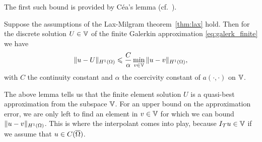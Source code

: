 \documentclass[thesis.tex]{subfiles}
\begin{document}
  The first such bound is provided by C\'ea's lemma (cf.~\cite[Thm~2.8.1]{brenner}).
  \begin{lem}
    Suppose the assumptions of the Lax-Milgram theorem~\ref{thm:lax} hold. Then for the discrete solution $U \in \mathbb{V}$ of the
    finite Galerkin approximation \eqref{eq:galerk_finite} we have
    \[
      \| u - U\|_{H^1(\Omega)} \leqslant {C \over \alpha} \min_{v \in \mathbb{V}} \| u - v\|_{H^1(\Omega)},
    \]
    with $C$ the continuity constant and $\alpha$ the coercivity constant of $a(\cdot, \cdot)$ on $\mathbb{V}$.
  \end{lem}
  The above lemma tells us that the finite element solution $U$ is a quasi-best approximation from the subspace $\mathbb{V}$.
  For an upper bound on the approximation error, we are
  only left to find an element in $v \in \mathbb{V}$ for which we can bound $\|u - v\|_{H^1(\Omega)}$. 
  This is where the interpolant comes into play, because $I_{\mathcal{T}}u \in \mathbb{V}$ if we assume that $u \in C(\overline{\Omega})$.
\end{document}
